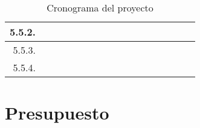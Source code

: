 \documentclass[12pt]{article}
\begin{document}
\begin{table}[H]
{\begin{tabular}{|rllllllllllllllll|}
        \multicolumn{1}{|r|}{5.5.2.} & \multicolumn{1}{l|}{} & \multicolumn{1}{l|}{} & \multicolumn{1}{l|}{} & \multicolumn{1}{l|}{} & \multicolumn{1}{l|}{} & \multicolumn{1}{l|}{} & \multicolumn{1}{l|}{} & \multicolumn{1}{l|}{} & \multicolumn{1}{l|}{} & \multicolumn{1}{l|}{} & \multicolumn{1}{l|}{} & \multicolumn{1}{l|}{} & \multicolumn{1}{c|}{\cellcolor[HTML]{B4A7D6}} & \multicolumn{1}{c|}{\cellcolor[HTML]{EA9999}} & \multicolumn{1}{c|}{\cellcolor[HTML]{EA9999}} & \multicolumn{1}{c|}{\cellcolor[HTML]{EA9999}} \\ \hline
        \multicolumn{1}{|r|}{5.5.3.} & \multicolumn{1}{l|}{} & \multicolumn{1}{l|}{} & \multicolumn{1}{l|}{} & \multicolumn{1}{l|}{} & \multicolumn{1}{l|}{} & \multicolumn{1}{l|}{} & \multicolumn{1}{l|}{} & \multicolumn{1}{l|}{} & \multicolumn{1}{l|}{} & \multicolumn{1}{l|}{} & \multicolumn{1}{l|}{} & \multicolumn{1}{l|}{} & \multicolumn{1}{c|}{\cellcolor[HTML]{B4A7D6}} & \multicolumn{1}{c|}{\cellcolor[HTML]{EA9999}} & \multicolumn{1}{c|}{\cellcolor[HTML]{EA9999}} & \multicolumn{1}{c|}{\cellcolor[HTML]{EA9999}} \\ \hline
        \multicolumn{1}{|r|}{5.5.4.} & \multicolumn{1}{l|}{} & \multicolumn{1}{l|}{} & \multicolumn{1}{l|}{} & \multicolumn{1}{l|}{} & \multicolumn{1}{l|}{} & \multicolumn{1}{l|}{} & \multicolumn{1}{l|}{} & \multicolumn{1}{l|}{} & \multicolumn{1}{l|}{} & \multicolumn{1}{l|}{} & \multicolumn{1}{l|}{} & \multicolumn{1}{c|}{\cellcolor[HTML]{B4A7D6}} & \multicolumn{1}{c|}{\cellcolor[HTML]{B4A7D6}} & \multicolumn{1}{c|}{\cellcolor[HTML]{EA9999}} & \multicolumn{1}{c|}{\cellcolor[HTML]{EA9999}} & \multicolumn{1}{c|}{\cellcolor[HTML]{EA9999}} \\ \hline
        \end{tabular}%
        }
        \caption[Tabla]{Cronograma del proyecto}
        \label{tab:cron}
        \end{table}

    \section{Presupuesto}
    
\end{document}

